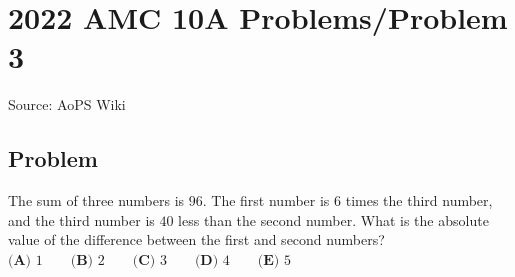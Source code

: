 \documentclass[12pt]{article}
\begin{document}
\section*{{2022 AMC 10A Problems/Problem 3}}
Source: AoPS Wiki

\subsection*{Problem}
The sum of three numbers is $96.$ The first number is $6$ times the third number, and the third number is $40$ less than the second number. What is the absolute value of the difference between the first and second numbers? $\textbf{(A) } 1 \qquad \textbf{(B) } 2 \qquad \textbf{(C) } 3 \qquad \textbf{(D) } 4 \qquad \textbf{(E) } 5$
\end{document}
